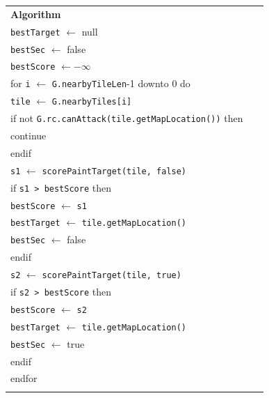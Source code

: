 \documentclass{article}
\newenvironment{pseudobox}
{
\centering
\begin{longtable}{|p{0.94\linewidth}|}
\hline
}
{
\\ \hline
\end{longtable}
\vspace{0.05cm}
}
\begin{document}
\begin{enumerate}[label=\alph*.]
\begin{enumerate}[label=\alph*.]
\begin{pseudobox}
\textbf{Algorithm} \\
\hspace*{1.5em}\texttt{bestTarget} $\leftarrow$ null \\
\hspace*{1.5em}\texttt{bestSec} $\leftarrow$ false \\
\hspace*{1.5em}\texttt{bestScore} $\leftarrow -\infty$ \\

\hspace*{1.5em}for \texttt{i} $\leftarrow$ \texttt{G.nearbyTileLen}-1 downto 0 do \\
\hspace*{3em}\texttt{tile} $\leftarrow$ \texttt{G.nearbyTiles[i]} \\

\hspace*{3em}if not \texttt{G.rc.canAttack(tile.getMapLocation())} then \\
\hspace*{4.5em}continue \\
\hspace*{3em}endif \\

\hspace*{3em}\texttt{s1} $\leftarrow$ \texttt{scorePaintTarget(tile, false)} \\
\hspace*{3em}if \texttt{s1 > bestScore} then \\
\hspace*{4.5em}\texttt{bestScore} $\leftarrow$ \texttt{s1} \\
\hspace*{4.5em}\texttt{bestTarget} $\leftarrow$ \texttt{tile.getMapLocation()} \\
\hspace*{4.5em}\texttt{bestSec} $\leftarrow$ false \\
\hspace*{3em}endif \\

\hspace*{3em}\texttt{s2} $\leftarrow$ \texttt{scorePaintTarget(tile, true)} \\
\hspace*{3em}if \texttt{s2 > bestScore} then \\
\hspace*{4.5em}\texttt{bestScore} $\leftarrow$ \texttt{s2} \\
\hspace*{4.5em}\texttt{bestTarget} $\leftarrow$ \texttt{tile.getMapLocation()} \\
\hspace*{4.5em}\texttt{bestSec} $\leftarrow$ true \\
\hspace*{3em}endif \\
\hspace*{1.5em}endfor \\


\end{pseudobox}
\end{enumerate}
\end{enumerate}
\end{document}
